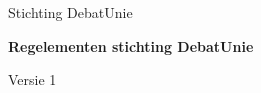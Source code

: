 \begin{titlepage}
   \begin{flushleft}
       \vspace*{3.5cm}

       Stichting DebatUnie

       \vspace{1.5cm}
       \textbf{\Huge{\color{debatUnieBlauw}Regelementen stichting DebatUnie}}
            
       \vspace{1cm}

       Versie 1

       \vfill
            
   \end{flushleft}
\end{titlepage}